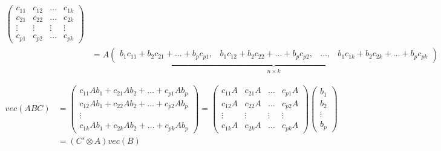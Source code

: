 \begin{enumerate}
\begin{solution}
\begin{align*}
\begin{pmatrix}
                      c_{11} & c_{12} & \dots  & c_{1k} \\
                      c_{21} & c_{22} & \dots  & c_{2k} \\
                      \vdots & \vdots & \vdots & \vdots \\
                      c_{p1} & c_{p2} & \dots  & c_{pk}
                  \end{pmatrix}                                                                                                                                                            \\
                      & = A \underbrace{\begin{pmatrix} b_1c_{11}+b_2c_{21}+\dots+b_p c_{p1},& b_1c_{12}+b_2c_{22}+\dots+b_p c_{p2}, & \dots ,& b_1c_{1k}+b_2c_{2k}+\dots+b_p c_{pk}\end{pmatrix}}_{n\times k}
              \end{align*}

              \begin{align*}
                  vec(ABC) & = \begin{pmatrix} c_{11}A b_1 +c_{21}A b_2+\dots+ c_{p1}A b_p\\ c_{12}A b_1+c_{22} A b_2 + \dots +  c_{p2} A b_p \\ \vdots \\ c_{1k}A b_1+ c_{2k} A b_2 +\dots+ c_{pk} A b_p  \end{pmatrix}
                  = \begin{pmatrix} c_{11}A &  c_{21}A  & \dots & c_{p1}A \\ c_{12}A  & c_{22} A & \dots & c_{p2} A\\ \vdots & \vdots &\vdots&\vdots \\ c_{1k}A & c_{2k} A &\dots& c_{pk} A  \end{pmatrix} \begin{pmatrix} b_1\\b_2\\ \vdots\\b_p\end{pmatrix} \\
                           & = \left(C'\otimes A\right) vec(B)
              \end{align*}

          \end{solution}


\end{enumerate}
